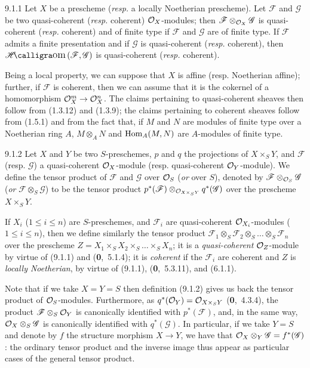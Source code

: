 \documentclass[../main.tex]{subfiles}
\begin{document}
\begin{cx}[Proposition]{9.1.1}
    Let $X$ be a prescheme (\emph{resp.} a locally Noetherian prescheme).
    Let $\mathscr{F}$ and $\mathscr{G}$ be two quasi-coherent (\emph{resp.} coherent) $\mathcal{O}_X$-modules; then $\mathscr{F}\otimes_{\mathcal{O}_X}\mathscr{G}$ is quasi-coherent (\emph{resp.} coherent) and of finite type if $\mathscr{F}$ and $\mathscr{G}$ are of finite type.
    If $\mathscr{F}$ admits a finite presentation and if $\mathscr{G}$ is quasi-coherent (\emph{resp.} coherent), then $\sheafHom(\mathscr{F},\mathscr{G})$ is quasi-coherent (\emph{resp.} coherent).
\end{cx}

Being a local property, we can suppose that $X$ is affine (resp. Noetherian affine); further, if $\mathscr{F}$ is coherent, then we can assume that it is the cokernel of a homomorphism $\mathcal{O}_X^m\to\mathcal{O}_X^n$.
The claims pertaining to quasi-coherent sheaves then follow from (1.3.12) and (1.3.9); the claims pertaining to coherent sheaves follow from (1.5.1) and from the fact that, if $M$ and $N$ are modules of finite type over a Noetherian ring $A$, $M\otimes_A N$ and $\operatorname*{Hom}_A(M,N)$ are $A$-modules of finite type.

\begin{cx}[Definition]{9.1.2}
    Let $X$ and $Y$ be two $S$-preschemes, $p$ and $q$ the projections of $X\times_S Y$, and $\mathscr{F}$ (resp. $\mathscr{G}$) a quasi-coherent $\mathcal{O}_X$-module (resp. quasi-coherent $\mathcal{O}_Y$-module).
    We define the tensor product of $\mathscr{F}$ and $\mathscr{G}$ over $\mathcal{O}_S$ (\emph{or} over $S$), denoted by $\mathscr{F}\otimes_{\mathcal{O}_S}\mathscr{G}$ (\emph{or} $\mathscr{F}\otimes_S\mathscr{G}$) to be the tensor product $p^*(\mathscr{F})\otimes_{\mathcal{O}_{X\times_S Y}}q^*(\mathscr{G})$ over the prescheme $X\times_S Y$.
\end{cx}

If $X_i$ ($1\leqslant i\leqslant n$) are $S$-preschemes, and $\mathscr{F}_i$ are quasi-coherent $\mathcal{O}_{X_i}$-modules ($1\leqslant i\leqslant n$), then we define similarly the tensor product $\mathscr{F}_1\otimes_S\mathscr{F}_2\otimes_S\ldots\otimes_S\mathscr{F}_n$ over the prescheme $Z=X_1\times_S X_2\times_S\ldots\times_S X_n$; it is a \emph{quasi-coherent} $\mathcal{O}_Z$-module by virtue of (9.1.1) and (\textbf{0},~5.1.4); it is \emph{coherent} if the $\mathscr{F}_i$ are coherent and $Z$ is \emph{locally Noetherian}, by virtue of (9.1.1), (\textbf{0},~5.3.11), and (6.1.1).

Note that if we take $X=Y=S$ then definition (9.1.2) gives us back the tensor product of $\mathcal{O}_S$-modules.
Furthermore, as $q^*(\mathcal{O}_Y)=\mathcal{O}_{X\times_S Y}$ (\textbf{0},~4.3.4), the product $\mathscr{F}\otimes_S\mathcal{O}_Y$ is canonically identified with $p^*(\mathscr{F})$, and, in the same way, $\mathcal{O}_X\otimes_S\mathscr{G}$ is canonically identified with $q^*(\mathscr{G})$.
In particular, if we take $Y=S$ and denote by $f$ the structure morphism $X\to Y$, we have that $\mathcal{O}_X\otimes_Y\mathscr{G}=f^*(\mathscr{G})$: the ordinary tensor product and the inverse image thus appear as particular cases of the general tensor product.
\end{document}

